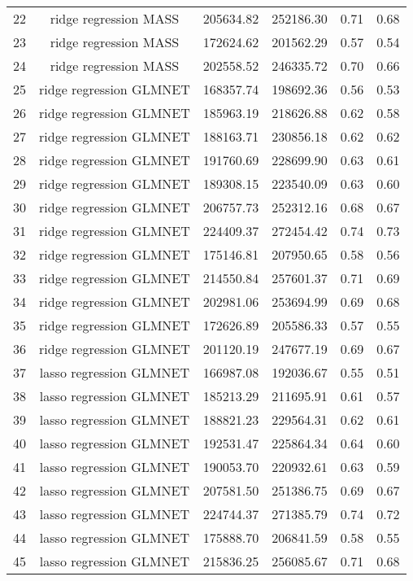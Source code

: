 \begin{tabular}{cccccc}
  22 & ridge regression MASS & 205634.82 & 252186.30 & 0.71 & 0.68 \\ 
  23 & ridge regression MASS & 172624.62 & 201562.29 & 0.57 & 0.54 \\ 
  24 & ridge regression MASS & 202558.52 & 246335.72 & 0.70 & 0.66 \\ 
  25 & ridge regression GLMNET & 168357.74 & 198692.36 & 0.56 & 0.53 \\ 
  26 & ridge regression GLMNET & 185963.19 & 218626.88 & 0.62 & 0.58 \\ 
  27 & ridge regression GLMNET & 188163.71 & 230856.18 & 0.62 & 0.62 \\ 
  28 & ridge regression GLMNET & 191760.69 & 228699.90 & 0.63 & 0.61 \\ 
  29 & ridge regression GLMNET & 189308.15 & 223540.09 & 0.63 & 0.60 \\ 
  30 & ridge regression GLMNET & 206757.73 & 252312.16 & 0.68 & 0.67 \\ 
  31 & ridge regression GLMNET & 224409.37 & 272454.42 & 0.74 & 0.73 \\ 
  32 & ridge regression GLMNET & 175146.81 & 207950.65 & 0.58 & 0.56 \\ 
  33 & ridge regression GLMNET & 214550.84 & 257601.37 & 0.71 & 0.69 \\ 
  34 & ridge regression GLMNET & 202981.06 & 253694.99 & 0.69 & 0.68 \\ 
  35 & ridge regression GLMNET & 172626.89 & 205586.33 & 0.57 & 0.55 \\ 
  36 & ridge regression GLMNET & 201120.19 & 247677.19 & 0.69 & 0.67 \\ 
  37 & lasso regression GLMNET & 166987.08 & 192036.67 & 0.55 & 0.51 \\ 
  38 & lasso regression GLMNET & 185213.29 & 211695.91 & 0.61 & 0.57 \\ 
  39 & lasso regression GLMNET & 188821.23 & 229564.31 & 0.62 & 0.61 \\ 
  40 & lasso regression GLMNET & 192531.47 & 225864.34 & 0.64 & 0.60 \\ 
  41 & lasso regression GLMNET & 190053.70 & 220932.61 & 0.63 & 0.59 \\ 
  42 & lasso regression GLMNET & 207581.50 & 251386.75 & 0.69 & 0.67 \\ 
  43 & lasso regression GLMNET & 224744.37 & 271385.79 & 0.74 & 0.72 \\ 
  44 & lasso regression GLMNET & 175888.70 & 206841.59 & 0.58 & 0.55 \\ 
  45 & lasso regression GLMNET & 215836.25 & 256085.67 & 0.71 & 0.68 \\ 

\end{tabular}
